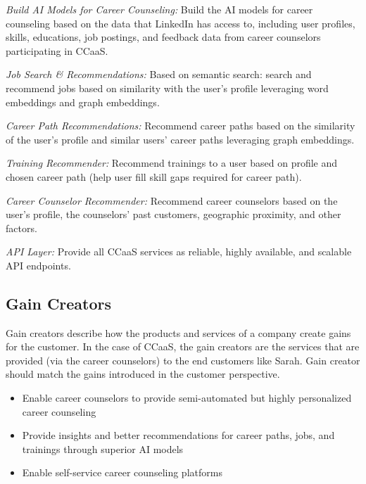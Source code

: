 \textit{Build AI Models for Career Counseling:}
    Build the AI models for career counseling based on the data that LinkedIn has access to, including
    user profiles, skills, educations, job postings, and feedback data from career counselors participating in CCaaS.
    \vspace{0.2cm}

\textit{Job Search \& Recommendations:}
    Based on semantic search: search and recommend jobs based on similarity with the user's profile leveraging
    word embeddings and graph embeddings.
    \vspace{0.2cm}

\textit{Career Path Recommendations:}
    Recommend career paths based on the similarity of the user's profile and  similar users' career paths
    leveraging graph embeddings.
    \vspace{0.2cm}

\textit{Training Recommender:}
    Recommend trainings to a user based on profile and chosen career path (help user fill skill gaps
    required for career path).
    \vspace{0.2cm}

\textit{Career Counselor Recommender:}
    Recommend career counselors based on the user's profile, the counselors' past customers, geographic 
    proximity, and other factors.
    \vspace{0.2cm}

\textit{API Layer:}
    Provide all CCaaS services as reliable, highly available, and scalable API endpoints.

\subsection{Gain Creators}

Gain creators describe how the products and services of a company create gains for the customer. In the
case of CCaaS, the gain creators are the services that are provided (via the career counselors) to the end
customers like Sarah. Gain creator should match the gains introduced in the customer perspective.

\begin{itemize}
    \item Enable career counselors to provide semi-automated but highly personalized career counseling
    \item Provide insights and better recommendations for career paths, jobs, and trainings through superior AI models
    \item Enable self-service career counseling platforms
\end{itemize}


